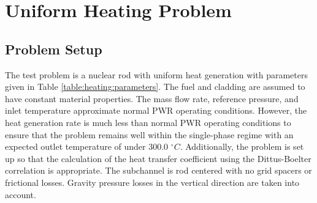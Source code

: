 \vspace*{-80mm}
\chapter{Uniform Heating Problem} \label{chapter5:uniform_heating1}
 
\section{Problem Setup}


The test problem is a nuclear rod with uniform heat generation with parameters
given in Table \ref{table:heating:parameters}. The fuel and cladding are assumed
to have constant material properties. The mass flow rate, reference pressure, and inlet
temperature approximate normal PWR operating conditions. However, the heat
generation rate is much less than normal PWR operating conditions to ensure that
the problem remains well  within the single-phase regime with an expected outlet
temperature of under 300.0 $^{\circ}C$. Additionally, the problem is set
up so that the calculation of the heat transfer coefficient using the Dittus-Boelter
correlation is appropriate. The subchannel is rod centered with no grid spacers
or frictional losses. Gravity pressure losses in the vertical direction are
taken into account. 

